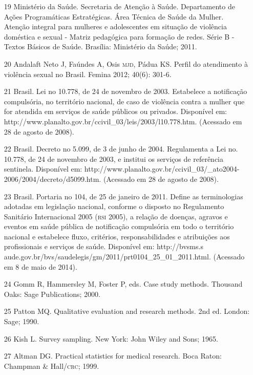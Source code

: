 \documentclass{article}
\begin{document}
\begin{itemize}
\item[19] Ministério da Saúde. Secretaria de Atenção à Saúde. Departamento
de Ações Programáticas Estratégicas. Área Técnica de Saúde da Mulher. Atenção
integral para mulheres e adolescentes em situação de violência doméstica e
sexual - Matriz pedagógica para formação de redes. Série B - Textos Básicos de
Saúde. Brasília: Ministério da Saúde; 2011.

\item[20] Andalaft Neto J, Faúndes A, Osis \textsc{mjd}, Pádua KS. Perfil do
atendimento à violência sexual no Brasil. Femina 2012; 40(6): 301-6.

\item[21] Brasil. Lei no 10.778, de 24 de novembro de 2003. Estabelece a
notificação compulsória, no território nacional, de caso de violência contra a
mulher que for atendida em serviços de saúde públicos ou privados. Disponível
em: http://www.planalto.gov.br/ccivil\_{}03/leis/2003/l10.778.htm. (Acessado em
28 de agosto de 2008).

\item[22] Brasil. Decreto no 5.099, de 3 de junho de 2004. Regulamenta a Lei
no. 10.778, de 24 de novembro de 2003, e institui os serviços de referência
sentinela. Disponível em:
http://www.planalto.gov.br/ccivil\_{}03/\_{}ato2004-2006/2004/decreto/d5099.htm.
(Acessado em 28 de agosto de 2008).

\item[23] Brasil. Portaria no 104, de 25 de janeiro de 2011. Define as
terminologias adotadas em legislação nacional, conforme o disposto no
Regulamento Sanitário Internacional 2005 (\textsc{rsi} 2005), a relação de doenças,
agravos e eventos em saúde pública de notificação compulsória em todo o
território nacional e estabelece fluxo, critérios, responsabilidades e
atribuições aos profissionais e serviços de saúde. Disponível em: http://bvsms.s
aude.gov.br/bvs/saudelegis/gm/2011/prt0104\_{}25\_{}01\_{}2011.html. (Acessado
em 8 de maio de 2014).

\item[24] Gomm R, Hammersley M, Foster P, eds. Case study methods. Thousand
Oaks: Sage Publications; 2000.

\item[25] Patton MQ. Qualitative evaluation and research methods. 2nd ed.
London: Sage; 1990.

\item[26] Kish L. Survey sampling. New York: John Wiley and Sons; 1965.

\item[27] Altman DG. Practical statistics for medical research. Boca Raton:
Champman \& Hall/\textsc{crc}; 1999.


\end{itemize}
\end{document}
